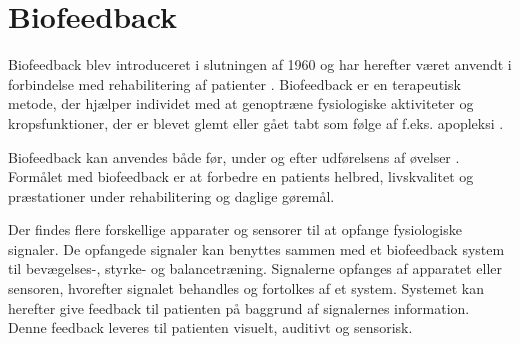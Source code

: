 \section{Biofeedback}
Biofeedback blev introduceret i slutningen af 1960 og har herefter været anvendt i forbindelse med rehabilitering af patienter \cite{Glanz1995, Prentice2007}. Biofeedback er en terapeutisk metode, der hjælper individet med at genoptræne fysiologiske aktiviteter og kropsfunktioner, der er blevet glemt eller gået tabt som følge af f.eks. apopleksi \cite{Prentice2007}. 

Biofeedback kan anvendes både før, under og efter udførelsens af øvelser \cite{Prentice2007, Giggins2013}. Formålet med biofeedback er at forbedre en patients helbred, livskvalitet og præstationer under rehabilitering og daglige gøremål. \cite{Prentice2007}


Der findes flere forskellige apparater og sensorer til at opfange fysiologiske signaler. De opfangede signaler kan benyttes sammen med et biofeedback system til bevægelses-, styrke- og balancetræning. Signalerne opfanges af apparatet eller sensoren, hvorefter signalet behandles og fortolkes af et system.  Systemet kan herefter give feedback til patienten på baggrund af signalernes information. \cite{Prentice2007} Denne feedback leveres til patienten visuelt, auditivt og sensorisk.


